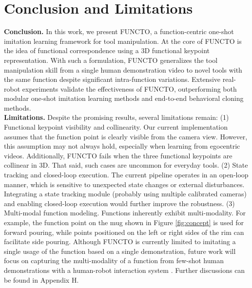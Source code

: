 \section{Conclusion and Limitations}
\noindent \textbf{Conclusion.}  In this work, we present FUNCTO, a function-centric one-shot imitation learning framework for tool manipulation. At the core of FUNCTO is the idea of functional correspondence using a 3D functional keypoint representation. With such a formulation, FUNCTO generalizes the tool manipulation skill from a single human demonstration video to novel tools with the same function despite significant intra-function variations. Extensive real-robot experiments validate the effectiveness of FUNCTO, outperforming both modular one-shot imitation learning methods and end-to-end behavioral cloning methods. \\

\noindent \textbf{Limitations.}  Despite the promising results, several limitations remain: (1) Functional keypoint visibility and collinearity. Our current implementation assumes that the function point is clearly visible from the camera view. However, this assumption may not always hold, especially when learning from egocentric videos. Additionally, FUNCTO fails when the three functional keypoints are collinear in 3D. That said, such cases are uncommon for everyday tools. (2) State tracking and closed-loop execution. The current pipeline operates in an open-loop manner, which is sensitive to unexpected state changes or external disturbances. Integrating a state tracking module (probably using multiple calibrated cameras) and enabling closed-loop execution would further improve the robustness. (3) Multi-modal function modeling. Functions inherently exhibit multi-modality. For example, the function point on the mug shown in Figure \ref{fig:concept} is used for forward pouring, while points positioned on the left or right sides of the rim can facilitate side pouring. Although FUNCTO is currently limited to imitating a single usage of the function based on a single demonstration, future work will focus on capturing the multi-modality of a function from few-shot human demonstrations with a human-robot interaction system \cite{xiao2024robi}. Further discussions can be found in Appendix H.













